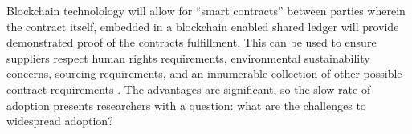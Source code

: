Blockchain technolology will allow for ``smart contracts'' between parties wherein the contract itself, embedded in a blockchain enabled shared ledger will provide demonstrated proof of the contracts fulfillment. This can be used to ensure suppliers respect human rights requirements, environmental sustainability concerns, sourcing requirements, and an innumerable collection of other possible contract requirements \parencite{tsolakisSupplyNetworkDesign2020}. The advantages are significant, so the slow rate of adoption presents researchers with a question: what are the challenges to widespread adoption?
